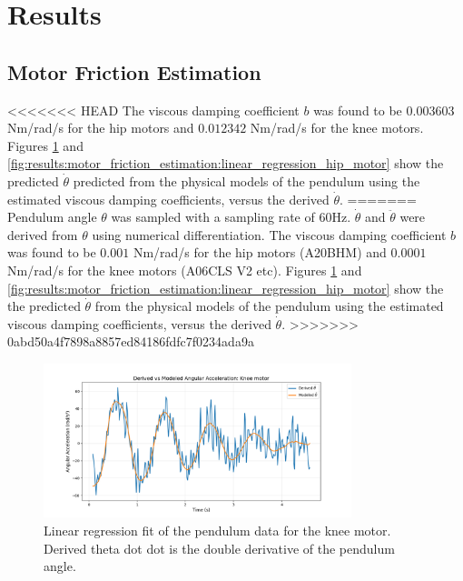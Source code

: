 \section{Results}
\label{sec:results}

\subsection{Motor Friction Estimation}
<<<<<<< HEAD
\label{sec:results:motor_friction_estimation}
  The viscous damping coefficient \( b \) was found to be \( 0.003603 \) Nm/rad/s for the hip motors and \( 0.012342 \) Nm/rad/s for the knee motors. Figures \ref{fig:results:motor_friction_estimation:linear_regression_knee_motor} and \ref{fig:results:motor_friction_estimation:linear_regression_hip_motor} show the predicted \(\dot{\theta}\) predicted from the physical models of the pendulum using the estimated viscous damping coefficients, versus the derived \(\dot{\theta}\).
=======
Pendulum angle \(\theta\) was sampled with a sampling rate of 60Hz. \(\dot{\theta}\) and \(\ddot{\theta}\) were derived from \(\theta\) using numerical differentiation. The viscous damping coefficient \( b \) was found to be \( 0.001 \) Nm/rad/s for the hip motors (A20BHM) and \( 0.0001 \) Nm/rad/s for the knee motors (A06CLS V2 etc). Figures \ref{fig:results:motor_friction_estimation:linear_regression_knee_motor} and \ref{fig:results:motor_friction_estimation:linear_regression_hip_motor} show the the predicted \(\dot{\theta}\) from the physical models of the pendulum using the estimated viscous damping coefficients, versus the derived \(\dot{\theta}\).
>>>>>>> 0abd50a4f7898a8857ed84186fdfc7f0234ada9a

\begin{figure}[h]
    \centering
    \includegraphics[width=0.8\textwidth]{Images/results/friction_est_knee_motor.png}
    \caption{Linear regression fit of the pendulum data for the knee motor. Derived theta dot dot is the double derivative of the pendulum angle.}
    \label{fig:results:motor_friction_estimation:linear_regression_knee_motor}
\end{figure}

